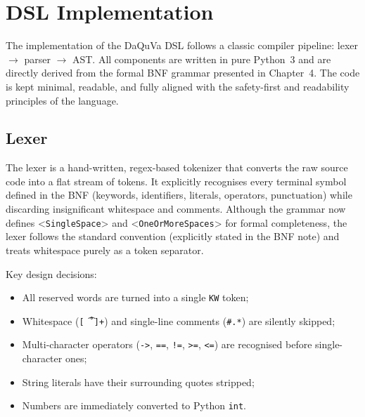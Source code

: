 \chapter{DSL Implementation}

The implementation of the DaQuVa DSL follows a classic compiler pipeline: lexer $\rightarrow$ parser $\rightarrow$ AST. All components are written in pure Python~3 and are directly derived from the formal BNF grammar presented in Chapter~4. The code is kept minimal, readable, and fully aligned with the safety-first and readability principles of the language.

\section{Lexer}

The lexer is a hand-written, regex-based tokenizer that converts the raw source code into a flat stream of tokens. It explicitly recognises every terminal symbol defined in the BNF (keywords, identifiers, literals, operators, punctuation) while discarding insignificant whitespace and comments. Although the grammar now defines <\texttt{\<SingleSpace\>}> and <\texttt{\<OneOrMoreSpaces\>}> for formal completeness, the lexer follows the standard convention (explicitly stated in the BNF note) and treats whitespace purely as a token separator.

Key design decisions:
\begin{itemize}[label=-, noitemsep]
    \item All reserved words are turned into a single \texttt{KW} token;
    \item Whitespace (\texttt{[ \t\r\n]+}) and single-line comments (\texttt{\#.*}) are silently skipped;
    \item Multi-character operators (\texttt{->}, \texttt{==}, \texttt{!=}, \texttt{>=}, \texttt{<=}) are recognised before single-character ones;
    \item String literals have their surrounding quotes stripped;
    \item Numbers are immediately converted to Python \texttt{int}.
\end{itemize}

